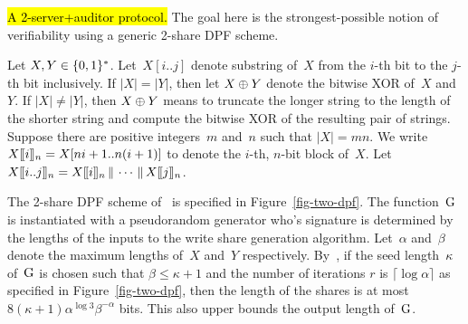 
\label{sec-twowriter}
\hl{A 2-server+auditor protocol.} The goal here is the strongest-possible notion
of verifiability using a generic 2-share DPF scheme.

Let $X, Y \in \bits^*$.
%
Let~$X[i..j]$ denote substring of~$X$ from the $i$-th bit to the $j$-th bit
inclusively.
%
If $|X| = |Y|$, then let $X \xor Y$ denote the bitwise XOR of~$X$ and~$Y$.  If
$|X| \ne |Y|$, then $X \xor Y$ means to truncate the longer string to the length
of the shorter string and compute the bitwise XOR of the resulting pair of
strings.
%
Suppose there are positive integers~$m$ and~$n$ such that $|X| = mn$. We write
$\block{n}{X}{i} = X[ni+1..n(i+1)]$ to denote the $i$-th, $n$-bit block of~$X$.
Let $\block{n}{X}{i..j} = \block{n}{X}{i} \cat \cdots \cat \block{n}{X}{j}$.

The 2-share DPF scheme of~\cite{dpf} is specified in Figure~\ref{fig-two-dpf}.
The function~$\prg$ is instantiated with a pseudorandom generator who's
signature is determined by the lengths of the inputs to the write share
generation algorithm.
%
Let~$\alpha$ and~$\beta$ denote the maximum lengths of~$X$ and~$Y$ respectively.
%
By~\cite[Proposition 1]{dpf}, if
the seed length~$\kappa$ of~$\prg$ is chosen such that $\beta \le \kappa + 1$
and the number of iterations $r$ is $\lceil \log \alpha \rceil$ as specified in
Figure~\ref{fig-two-dpf}, then the length of the shares is at most
$8(\kappa+1)\alpha^{\log 3}\beta^{-\alpha}$ bits. This also upper bounds
the output length of~$\prg$. 


